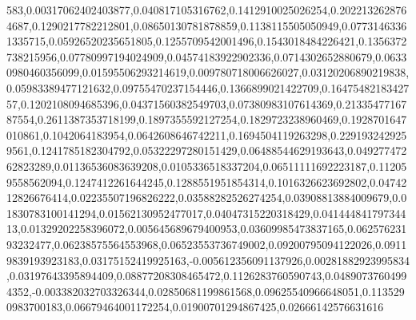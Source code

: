 583,0.00317062402403877,0.040817105316762,0.1412910025026254,0.2022132628764687,0.1290217782212801,0.08650130781878859,0.1138115505050949,0.07731463361335715,0.05926520235651805,0.1255709542001496,0.1543018484226421,0.1356372738215956,0.07780997194024909,0.04574183922902336,0.0714302652880679,0.06330980460356099,0.01595506293214619,0.009780718006626027,0.03120206890219838,0.05983389477121632,0.09755470237154446,0.1366899021422709,0.1647548218342757,0.1202108094685396,0.04371560382549703,0.07380983107614369,0.2133547716787554,0.2611387353718199,0.1897355592127254,0.1829723238960469,0.1928701647010861,0.1042064183954,0.0642608646742211,0.1694504119263298,0.2291932429259561,0.1241785182304792,0.05322297280151429,0.06488544629193643,0.04927747262823289,0.01136536083639208,0.0105336518337204,0.06511111692223187,0.112059558562094,0.1247412261644245,0.1288551951854314,0.1016326623692802,0.0474212826676414,0.02235507196826222,0.03588282526274254,0.03908813884009679,0.01830783100141294,0.01562130952477017,0.04047315220318429,0.04144484179734413,0.01329202258396072,0.005645689679400953,0.03609985473837165,0.06257623193232477,0.06238575564553968,0.06523553736749002,0.09200795094122026,0.09119839193923183,0.03175152419925163,-0.005612356091137926,0.00281882923995834,0.03197643395894409,0.08877208308465472,0.1126283760590743,0.04890737604994352,-0.003382032703326344,0.02850681199861568,0.09625540966648051,0.1135290983700183,0.06679464001172254,0.01900701294867425,0.02666142576631616
